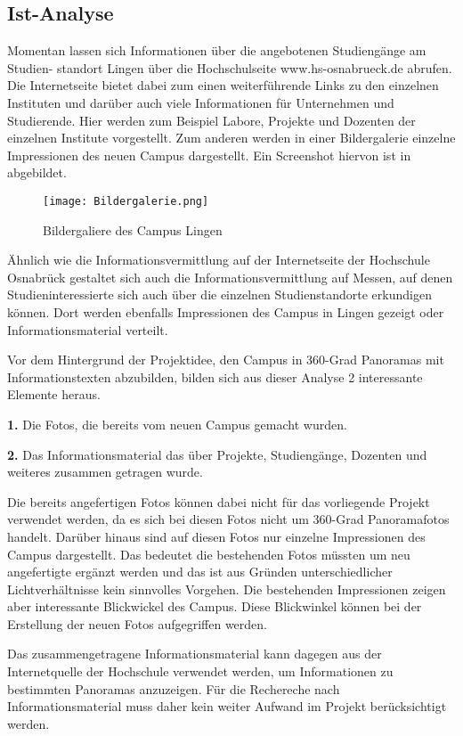 \subsection{Ist-Analyse}
\label{sec:IstAnalyse}

Momentan lassen sich Informationen über die angebotenen Studiengänge am Studien-
standort Lingen über die Hochschulseite www.hs-osnabrueck.de abrufen. Die Internetseite bietet dabei zum einen 
weiterführende Links zu den einzelnen Instituten und darüber auch viele Informationen für Unternehmen und Studierende.
Hier werden zum Beispiel Labore, Projekte und Dozenten der einzelnen Institute vorgestellt. Zum anderen werden in einer 
Bildergalerie einzelne Impressionen des neuen Campus dargestellt. Ein Screenshot hiervon ist in  abgebildet.

\begin{figure}[htb]
\centering
\texttt{[image: Bildergalerie.png]}
\caption[Bildergalerie des Campus Lingen]{Bildergaliere des Campus Lingen\protect\footnotemark}
\label{fig:Bildergalerie}
\end{figure}

Ähnlich wie die Informationsvermittlung auf der Internetseite der Hochschule Osnabrück
gestaltet sich auch die Informationsvermittlung auf Messen, auf denen Studieninteressierte
sich auch über die einzelnen Studienstandorte erkundigen können. Dort werden ebenfalls
Impressionen des Campus in Lingen gezeigt oder Informationsmaterial verteilt.

Vor dem Hintergrund der Projektidee, den Campus in 360-Grad Panoramas mit Informationstexten abzubilden, bilden sich aus 
dieser Analyse 2 interessante Elemente heraus.

\textbf{1.} Die Fotos, die bereits vom neuen Campus gemacht wurden.

\textbf{2.} Das Informationsmaterial das über Projekte, Studiengänge, Dozenten und weiteres zusammen getragen wurde.

Die bereits angefertigen Fotos können dabei nicht für das vorliegende Projekt verwendet werden, da es sich bei diesen 
Fotos nicht um 360-Grad Panoramafotos handelt. Darüber hinaus sind auf diesen Fotos nur einzelne Impressionen des Campus 
dargestellt. Das bedeutet die bestehenden Fotos müssten um neu angefertigte ergänzt werden und das ist aus Gründen 
unterschiedlicher Lichtverhältnisse kein sinnvolles Vorgehen. Die bestehenden Impressionen zeigen aber
interessante Blickwickel des Campus. Diese Blickwinkel können bei der Erstellung der neuen Fotos aufgegriffen werden. 

Das zusammengetragene Informationsmaterial kann dagegen aus der Internetquelle der Hochschule verwendet werden, um 
Informationen zu bestimmten Panoramas anzuzeigen. Für die Rechereche nach Informationsmaterial muss daher kein weiter 
Aufwand im Projekt berücksichtigt werden.